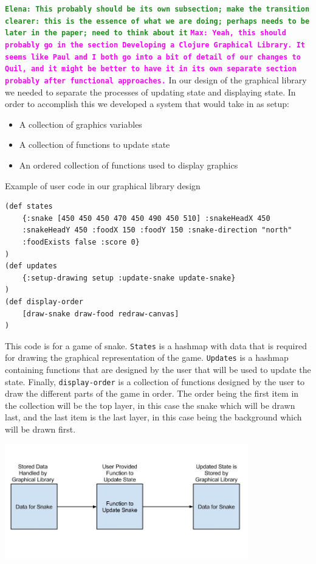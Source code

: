 \documentclass[12pt]{article}
\newcommand{\comment}[1]{{\bf \tt  {#1}}}
\newcommand{\emcomment}[1]{\textcolor{ForestGreen}{\comment{Elena: {#1}}}}
\newcommand{\mmcomment}[1]{\textcolor{magenta}{\comment{Max: {#1}}}}
\begin{document}
\emcomment{This probably should be its own subsection; make the transition clearer: this is the essence of what we are doing; perhaps needs to be later in the paper; need to think about it}
\mmcomment{Yeah, this should probably go in the section Developing a Clojure Graphical Library. It seems like Paul and I both go into a bit of detail of our changes to Quil, and it might be better to have it in its own separate section probably after functional approaches.}
In our design of the graphical library we needed to separate the processes of updating state and displaying state. In order to accomplish this we developed a system that would take in as setup:
\begin{itemize}
	\item A collection of graphics variables
	\item A collection of functions to update state
	\item An ordered collection of functions used to display graphics
\end{itemize}
Example of user code in our graphical library design
\begin{verbatim}
(def states 
	{:snake [450 450 450 470 450 490 450 510] :snakeHeadX 450 
	:snakeHeadY 450 :foodX 150 :foodY 150 :snake-direction "north" 
	:foodExists false :score 0}
)
(def updates
	{:setup-drawing setup :update-snake update-snake}
)
(def display-order
	[draw-snake draw-food redraw-canvas]
)
\end{verbatim}
This code is for a game of snake. \texttt{States} is a hashmap with data that is required for drawing the graphical representation of the game. \texttt{Updates} is a hashmap containing functions that are designed by the user that will be used to update the state. Finally, \texttt{display-order} is a collection of functions designed by the user to draw the different parts of the game in order. The order being the first item in the collection will be the top layer, in this case the snake which will be drawn last, and the last item is the last layer, in this case being the background which will be drawn first.

\begin{center}
\includegraphics[width=300pt]{Handling_State_in_Graphical_Library}
\end{center}
 
\end{document}
